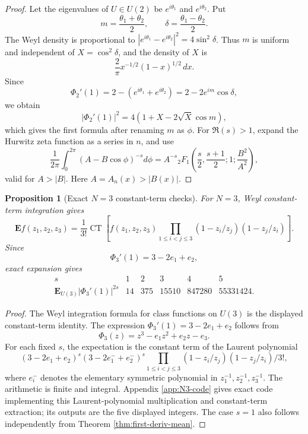 \documentclass[11pt]{article}
\theoremstyle{plain}
\newtheorem{proposition}[theorem]{Proposition}
\theoremstyle{definition}
\begin{document}
\begin{proof}
Let the eigenvalues of \(U\in U(2)\) be \(e^{i\theta_1}\) and \(e^{i\theta_2}\).  Put
\[
   m=\frac{\theta_1+\theta_2}{2},\qquad \delta=\frac{\theta_1-\theta_2}{2}.
\]
The Weyl density is proportional to \(|e^{i\theta_1}-e^{i\theta_2}|^2=4\sin^2\delta\).  Thus \(m\) is uniform and independent of \(X=\cos^2\delta\), and the density of \(X\) is
\[
   \frac2\pi x^{-1/2}(1-x)^{1/2}\,dx.
\]
Since
\[
   \Phi_2'(1)=2-(e^{i\theta_1}+e^{i\theta_2})=2-2e^{im}\cos\delta,
\]
we obtain
\[
   |\Phi_2'(1)|^2=4(1+X-2\sqrt X\cos m),
\]
which gives the first formula after renaming \(m\) as \(\phi\).  For \(\Re(s)>1\), expand the Hurwitz zeta function as a series in \(n\), and use
\[
   \frac1{2\pi}\int_0^{2\pi}(A-B\cos\phi)^{-s}d\phi
   =A^{-s}{}_2F_1\left(\frac s2,\frac{s+1}{2};1;\frac{B^2}{A^2}\right),
\]
valid for \(A>|B|\).  Here \(A=A_n(x)>|B(x)|\).
\end{proof}

\begin{proposition}[Exact \(N=3\) constant-term checks]\label{prop:N3-constant-term-checks}
For \(N=3\), Weyl constant-term integration gives
\[
 \mathbf E f(z_1,z_2,z_3)=\frac1{3!}\operatorname{CT}\left[f(z_1,z_2,z_3)
 \prod_{1\le i<j\le3}(1-z_i/z_j)(1-z_j/z_i)\right].
\]
Since
\[
   \Phi_3'(1)=3-2e_1+e_2,
\]
exact expansion gives
\[
\begin{array}{c|ccccc}
 s&1&2&3&4&5\\ \hline
 \mathbf E_{U(3)}|\Phi_3'(1)|^{2s}&14&375&15510&847280&55331424.
\end{array}
\]
\end{proposition}

\begin{proof}
The Weyl integration formula for class functions on \(U(3)\) is the displayed constant-term identity.  The expression \(\Phi_3'(1)=3-2e_1+e_2\) follows from
\[
   \Phi_3(z)=z^3-e_1z^2+e_2z-e_3.
\]
For each fixed \(s\), the expectation is the constant term of the Laurent polynomial
\[
   (3-2e_1+e_2)^s(3-2e_1^{-}+e_2^{-})^s
   \prod_{1\le i<j\le3}(1-z_i/z_j)(1-z_j/z_i)/3!,
\]
where \(e_i^{-}\) denotes the elementary symmetric polynomial in \(z_1^{-1},z_2^{-1},z_3^{-1}\).  The arithmetic is finite and integral.  Appendix \ref{app:N3-code} gives exact code implementing this Laurent-polynomial multiplication and constant-term extraction; its outputs are the five displayed integers.  The case \(s=1\) also follows independently from Theorem \ref{thm:first-deriv-mean}.
\end{proof}
\end{document}
